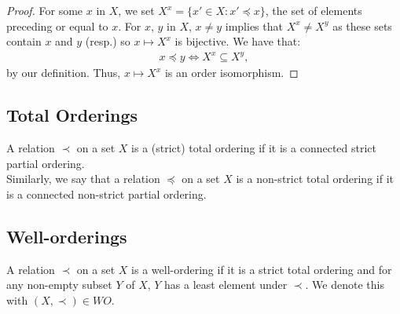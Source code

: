 \begin{proof}
   For some $x$ in $X$, we set $X^x = \{x' \in X : x' \preceq x\}$,
   the set of elements preceding or equal to $x$. For $x$, $y$
   in $X$, $x \neq y$ implies that $X^x \neq X^y$ as these sets
   contain $x$ and $y$ (resp.) so $x \mapsto X^x$ is bijective.
   We have that: \begin{align*}
       x \preceq y \Longleftrightarrow X^x \subseteq X^y,
   \end{align*} by our definition. Thus, $x \mapsto X^x$ is
   an order isomorphism.
\end{proof}

\subsection{Total Orderings}

A relation $\prec$ on a set $X$ is a (strict) total ordering if it
is a connected strict partial ordering.
\\[\baselineskip]
Similarly, we say that a relation $\preceq$ on a set $X$ is a non-strict
total ordering if it is a connected non-strict partial ordering.

\subsection{Well-orderings}

A relation $\prec$ on a set $X$ is a well-ordering if it is a
strict total ordering and for any non-empty subset $Y$ of $X$,
$Y$ has a least element under $\prec$. We denote this with 
$(X, \prec) \in WO$.
